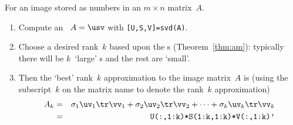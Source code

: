 \begin{example}
\begin{solution}
\begin{enumerate}
\end{enumerate}
\end{solution}
\end{example}



\begin{procedure} \label{pro:ai} 
For an image stored as numbers in an \(m\times n\) matrix~\(A\).
\begin{enumerate}
\item Compute an \svd\ \(A=\usv\) with \verb|[U,S,V]=svd(A)|.
\item Choose a desired rank~\(k\) based upon the s (Theorem~\ref{thm:am}): typically there will be \(k\)~`large' s and the rest are `small'.
\item Then the `best' rank~\(k\) approximation to the image matrix~\(A\) is (using the subscript~\(k\) on the matrix name to denote the rank~\(k\) approximation)
\begin{eqnarray*}
A_k&=&\sigma_1\uv_1\tr\vv_1+\sigma_2\uv_2\tr\vv_2+\cdots+\sigma_k\uv_k\tr\vv_k
\\&=&\verb|U(:,1:k)*S(1:k,1:k)*V(:,1:k)'|
\end{eqnarray*}
\end{enumerate}
\end{procedure}






